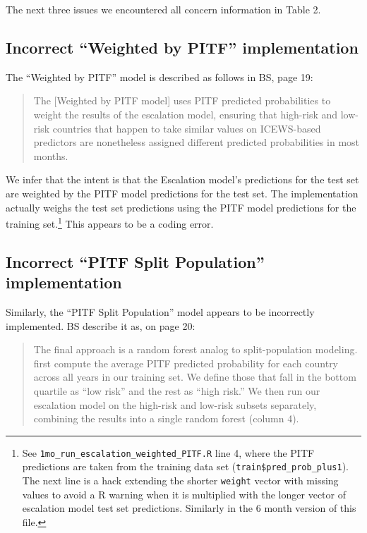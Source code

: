 \documentclass[]{article}
\let\rmarkdownfootnote\footnote%
\def\footnote{\protect\rmarkdownfootnote}
\begin{document}
The next three issues we encountered all concern information in Table 2.

\hypertarget{incorrect-weighted-by-pitf-implementation}{%
\subsection{Incorrect ``Weighted by PITF''
implementation}\label{incorrect-weighted-by-pitf-implementation}}

The ``Weighted by PITF'' model is described as follows in BS, page 19:

\begin{quote}
The {[}Weighted by PITF model{]} uses PITF predicted probabilities to
weight the results of the escalation model, ensuring that high-risk and
low-risk countries that happen to take similar values on ICEWS-based
predictors are nonetheless assigned different predicted probabilities in
most months.
\end{quote}

We infer that the intent is that the Escalation model's predictions for
the test set are weighted by the PITF model predictions for the test
set. The implementation actually weighs the test set predictions using
the PITF model predictions for the training set.\footnote{See
  \texttt{1mo\_run\_escalation\_weighted\_PITF.R} line 4, where the PITF
  predictions are taken from the training data set
  (\texttt{train\$pred\_prob\_plus1}). The next line is a hack extending
  the shorter \texttt{weight} vector with missing values to avoid a R
  warning when it is multiplied with the longer vector of escalation
  model test set predictions. Similarly in the 6 month version of this
  file.} This appears to be a coding error.

\hypertarget{incorrect-pitf-split-population-implementation}{%
\subsection{Incorrect ``PITF Split Population''
implementation}\label{incorrect-pitf-split-population-implementation}}

Similarly, the ``PITF Split Population'' model appears to be incorrectly
implemented. BS describe it as, on page 20:

\begin{quote}
The final approach is a random forest analog to split-population
modeling. first compute the average PITF predicted probability for each
country across all years in our training set. We define those that fall
in the bottom quartile as ``low risk'' and the rest as ``high risk.'' We
then run our escalation model on the high-risk and low-risk subsets
separately, combining the results into a single random forest (column
4).
\end{quote}
\end{document}
